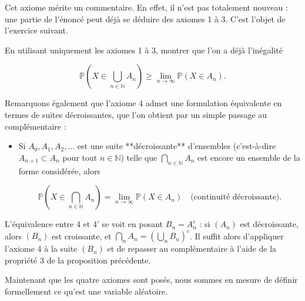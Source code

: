 Cet axiome mérite un commentaire. En effet, il n'est pas totalement nouveau : une partie de l'énoncé peut déjà se déduire des axiomes 1 à 3. C'est l'objet de l'exercice suivant.

\begin{exercice}
En utilisant uniquement les axiomes 1 à 3, montrer que l'on a déjà l'inégalité

$$
\mathbb{P}\left(X \in \bigcup_{n \in \mathbb{N}} A_n\right) \geq \lim_{n \to \infty} \mathbb{P}(X \in A_n).
$$
\end{exercice}

\newpage











Remarquons également que l'axiome 4 admet une formulation équivalente en termes de suites décroissantes, que l'on obtient par un simple passage au complémentaire :

\medskip

\begin{mdframed}
\begin{definition}
\begin{itemize}
\item[$\boxed{4^\prime.}$] Si $A_0, A_1, A_2, \dots$ est une suite **décroissante** d'ensembles (c'est-à-dire $A_{n+1} \subset A_n$ pour tout $n \in \mathbb{N}$) telle que $\bigcap_{n \in \mathbb{N}} A_n$ est encore un ensemble de la forme considérée, alors

$$
\mathbb{P}\left(X \in \bigcap_{n \in \mathbb{N}} A_n\right) = \lim_{n \to \infty} \mathbb{P}(X \in A_n) \quad \text{(continuité décroissante)}.
$$
\end{itemize}
\end{definition}
\end{mdframed}

\begin{remarque}
L'équivalence entre 4 et 4' se voit en posant $B_n = A_n^c$ : si $(A_n)$ est décroissante, alors $(B_n)$ est croissante, et $\bigcap_n A_n = \left(\bigcup_n B_n\right)^c$. Il suffit alors d'appliquer l'axiome 4 à la suite $(B_n)$ et de repasser au complémentaire à l'aide de la propriété 3 de la proposition précédente.
\end{remarque}

Maintenant que les quatre axiomes sont posés, nous sommes en mesure de définir formellement ce qu'est une variable aléatoire.


